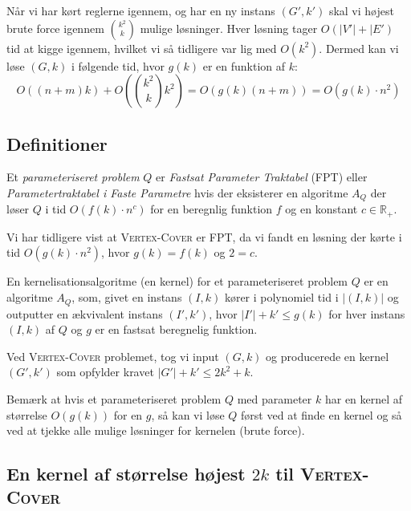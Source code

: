 Når vi har kørt reglerne igennem, og har en ny instans $(G', k')$ skal vi højest brute force igennem $\binom{k^{2}}{k}$ mulige løsninger. Hver løsning tager $O(|V'|+|E')$ tid at kigge igennem, hvilket vi så tidligere var lig med $O(k^{2})$. Dermed kan vi løse $(G, k)$ i følgende tid, hvor $g(k)$ er en funktion af $k$:
\begin{equation*}
	O((n+m)k) + O(\binom{k^{2}}{k}k^{2}) = O(g(k)(n+m)) = O(g(k)\cdot n^{2})
\end{equation*}

\subsection{Definitioner}%
\label{subsec:label}

\begin{definition}
	Et \textit{parameteriseret problem} $Q$ er \textit{Fastsat Parameter Traktabel} (FPT) eller \textit{Parametertraktabel i Faste Parametre} hvis der eksisterer en algoritme $A_{Q}$ der løser $Q$ i tid $O(f(k) \cdot n^{c})$ for en beregnlig funktion $f$ og en konstant $c \in \mathbb{R}_{+}$.
\end{definition}

Vi har tidligere vist at \textsc{Vertex-Cover} er FPT, da vi fandt en løsning der kørte i tid $O(g(k) \cdot n^{2})$, hvor $g(k) = f(k)$ og $2 = c$.

\begin{definition}
	En kernelisationsalgoritme (en kernel) for et parameteriseret problem $Q$ er en algoritme $A_{Q}$, som, givet en instans $(I,k)$ kører i polynomiel tid i $|(I,k)|$ og outputter en ækvivalent instans $(I', k')$, hvor $|I'| + k' \le g(k)$ for hver instans $(I, k)$ af $Q$ og $g$ er en fastsat beregnelig funktion.
\end{definition}

Ved \textsc{Vertex-Cover} problemet, tog vi input $(G, k)$ og producerede en kernel $(G', k')$ som opfylder kravet $|G'| + k' \le 2k^{2} + k$.

Bemærk at hvis et parameteriseret problem $Q$ med parameter $k$ har en kernel af størrelse $O(g(k))$ for en $g$, så kan vi løse $Q$ først ved at finde en kernel og så ved at tjekke alle mulige løsninger for kernelen (brute force).


\subsection{En kernel af størrelse højest $2k$ til \textsc{Vertex-Cover}}%
\label{subsec:kernel2k}

